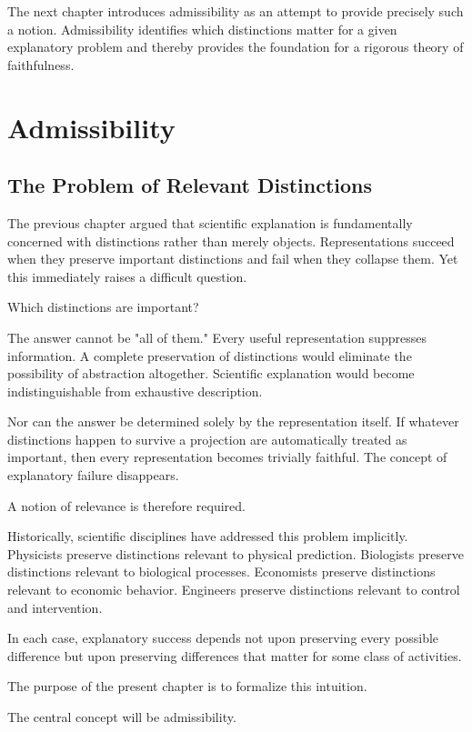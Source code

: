 \documentclass[11pt,oneside,openany]{book}
\begin{document}
The next chapter introduces admissibility as an attempt to provide precisely such a notion. Admissibility identifies which distinctions matter for a given explanatory problem and thereby provides the foundation for a rigorous theory of faithfulness.

\chapter{Admissibility}

\section{The Problem of Relevant Distinctions}

The previous chapter argued that scientific explanation is fundamentally concerned with distinctions rather than merely objects. Representations succeed when they preserve important distinctions and fail when they collapse them. Yet this immediately raises a difficult question.

Which distinctions are important?

The answer cannot be "all of them." Every useful representation suppresses information. A complete preservation of distinctions would eliminate the possibility of abstraction altogether. Scientific explanation would become indistinguishable from exhaustive description.

Nor can the answer be determined solely by the representation itself. If whatever distinctions happen to survive a projection are automatically treated as important, then every representation becomes trivially faithful. The concept of explanatory failure disappears.

A notion of relevance is therefore required.

Historically, scientific disciplines have addressed this problem implicitly. Physicists preserve distinctions relevant to physical prediction. Biologists preserve distinctions relevant to biological processes. Economists preserve distinctions relevant to economic behavior. Engineers preserve distinctions relevant to control and intervention.

In each case, explanatory success depends not upon preserving every possible difference but upon preserving differences that matter for some class of activities.

The purpose of the present chapter is to formalize this intuition.

The central concept will be admissibility.
\end{document}
